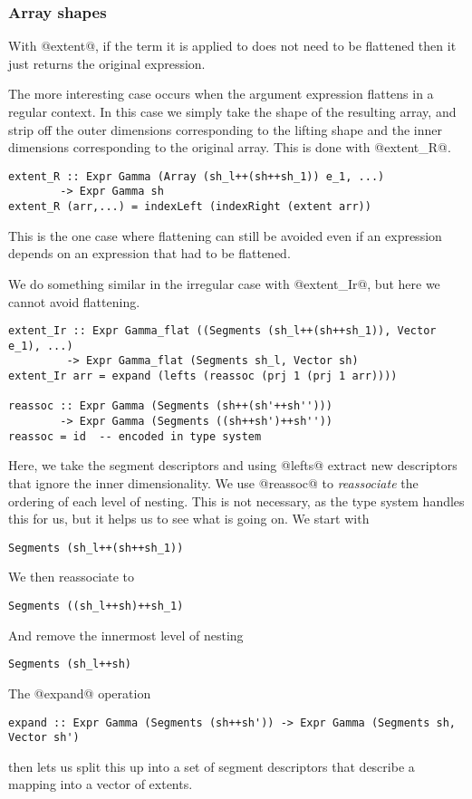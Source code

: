 \subsubsection{Array shapes}
With @extent@, if the term it is applied to does not need to be flattened then it just returns the original expression.

The more interesting case occurs when the argument expression flattens in a regular context. In this case we simply take the shape of the resulting array, and strip off the outer dimensions corresponding to the lifting shape and the inner dimensions corresponding to the original array. This is done with @extent_R@.
%
\begin{lstlisting}[style=ndp]
extent_R :: Expr Gamma (Array (sh_l++(sh++sh_1)) e_1, ...)
        -> Expr Gamma sh
extent_R (arr,...) = indexLeft (indexRight (extent arr))
\end{lstlisting}
%
This is the one case where flattening can still be avoided even if an expression depends on an expression that had to be flattened.

We do something similar in the irregular case with @extent_Ir@, but here we cannot avoid flattening.
%
\begin{lstlisting}[style=ndp]
extent_Ir :: Expr Gamma_flat ((Segments (sh_l++(sh++sh_1)), Vector e_1), ...)
         -> Expr Gamma_flat (Segments sh_l, Vector sh)
extent_Ir arr = expand (lefts (reassoc (prj 1 (prj 1 arr))))

reassoc :: Expr Gamma (Segments (sh++(sh'++sh'')))
        -> Expr Gamma (Segments ((sh++sh')++sh''))
reassoc = id  -- encoded in type system
\end{lstlisting}
%
Here, we take the segment descriptors and using @lefts@ extract new descriptors that ignore the inner dimensionality. We use @reassoc@ to \emph{reassociate} the ordering of each level of nesting. This is not necessary, as the type system handles this for us, but it helps us to see what is going on. We start with
%
\begin{lstlisting}[style=ndp]
Segments (sh_l++(sh++sh_1))
\end{lstlisting}
%
We then reassociate to
%
\begin{lstlisting}[style=ndp]
Segments ((sh_l++sh)++sh_1)
\end{lstlisting}
%
And remove the innermost level of nesting
%
\begin{lstlisting}[style=ndp]
Segments (sh_l++sh)
\end{lstlisting}
%
The @expand@ operation
%
\begin{lstlisting}[style=ndp]
expand :: Expr Gamma (Segments (sh++sh')) -> Expr Gamma (Segments sh, Vector sh')
\end{lstlisting}
%
then lets us split this up into a set of segment descriptors that describe a mapping into a vector of extents.

